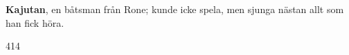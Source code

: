 \textbf{Kajutan}, en båtsman från Rone; kunde icke spela, men sjunga nästan allt som han fick höra. 

414 
